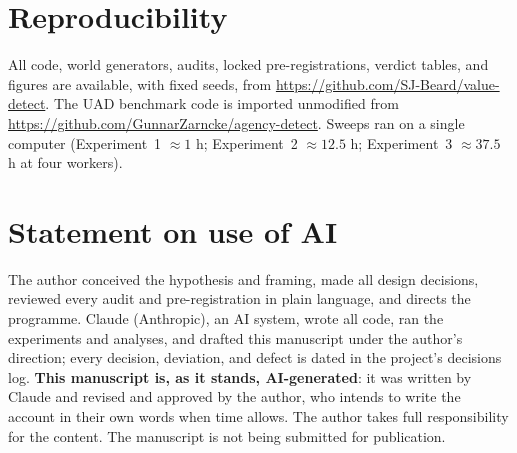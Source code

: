 \documentclass[11pt]{article}
\begin{document}
\section*{Reproducibility}
All code, world generators, audits, locked pre-registrations,
verdict tables, and figures are available, with fixed seeds, from \url{https://github.com/SJ-Beard/value-detect}.
The UAD benchmark code is
imported unmodified from \url{https://github.com/GunnarZarncke/agency-detect}. Sweeps ran on a single computer (Experiment~1 $\approx 1$ h; Experiment~2
$\approx 12.5$ h; Experiment~3 $\approx 37.5$ h at four workers).

\section*{Statement on use of AI}
The author conceived the hypothesis and framing, made all design decisions, reviewed
every audit and pre-registration in plain language, and directs the programme. Claude
(Anthropic), an AI system, wrote all code, ran the experiments and analyses, and drafted
this manuscript under the author's direction; every decision, deviation, and defect is
dated in the project's decisions log. \textbf{This manuscript is, as it stands,
AI-generated}: it was written by Claude and revised and approved by the author, who
intends to write the account in their own words when time allows. The author takes full responsibility
for the content. The manuscript is not being submitted for publication.



\end{document}
